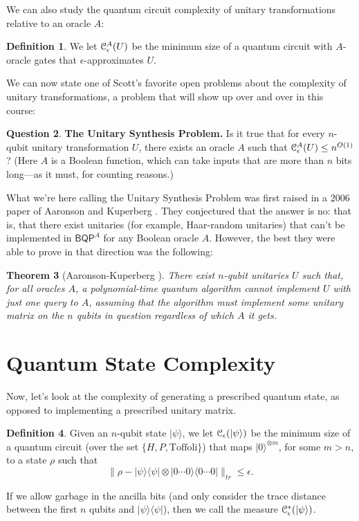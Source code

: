 \documentclass[11pt]{report}
\theoremstyle{plain}
\newtheorem{theorem}{Theorem}[section]
\theoremstyle{definition}
\newtheorem{definition}[theorem]{Definition}
\newtheorem{question}[theorem]{Question}
\renewcommand{\ket}[1]{|#1\rangle}
\newcommand{\ketbra}[2]{|#1\rangle\!\langle#2|}
\begin{document}
We can also study the quantum circuit complexity of unitary transformations relative to an oracle $A$:

\begin{definition}
We let ${\cal C}^A_{\epsilon}(U)$ be the minimum size of a quantum circuit with $A$-oracle gates that $\epsilon$-approximates $U$.
\end{definition}

We can now state one of Scott's favorite open problems about the complexity of unitary transformations, a problem that will show up over and over in this course:

\begin{question}
{\bf The Unitary Synthesis Problem.} Is it true that for every $n$-qubit unitary transformation $U$, there exists an oracle $A$ such that ${\cal C}^A_{\epsilon}(U)\leq n^{O(1)}$? (Here $A$ is a Boolean function, which can take inputs that are more than $n$ bits long---as it must, for counting reasons.)
\end{question}

What we're here calling the Unitary Synthesis Problem was first raised in a 2006 paper of Aaronson and Kuperberg \cite{ak}.  They conjectured that the answer is no: that is, that there exist unitaries (for example, Haar-random unitaries) that can't be implemented in $\mathsf{BQP}^A$ for any Boolean oracle $A$. However, the best they were able to prove in that direction was the following:

\begin{theorem}[Aaronson-Kuperberg \cite{ak}]
There exist $n$-qubit unitaries $U$ such that, for all oracles $A$, a polynomial-time quantum algorithm cannot implement $U$ with just one query to $A$, assuming that the algorithm must implement {\em some} unitary matrix on the $n$ qubits in question regardless of which $A$ it gets.
\end{theorem}

\section{Quantum State Complexity}

Now, let's look at the complexity of generating a prescribed quantum state, as opposed to implementing a prescribed unitary matrix.

\begin{definition}
Given an $n$-qubit state $\ket{\psi}$, we let $\cal C_{\epsilon}(\ket{\psi})$ be the minimum size of a quantum circuit (over the set $\{H,P,\mbox{Toffoli}\}$) that maps $\ket{0}^{\otimes m}$, for some $m>n$, to a state $\rho$ such that
\[
\|\rho-\ketbra{\psi}{\psi}\otimes \ketbra{0\cdots 0}{0 \cdots 0} \|_{tr}\leq\epsilon .
\]

If we allow garbage in the ancilla bits (and only consider the trace distance between the first $n$ qubits and $\ketbra{\psi}{\psi}$), then we call the measure $\cal C^*_{\epsilon}(\ket{\psi})$.
\end{definition}
\end{document}
